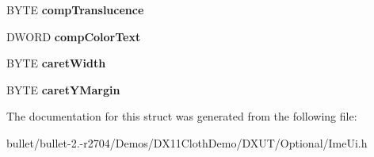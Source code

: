 \begin{DoxyCompactItemize}
\item 
\hypertarget{struct_i_m_e_u_i___a_p_p_e_a_r_a_n_c_e_a931d21cab9e666e913d1052e0c5248dd}{B\+Y\+T\+E {\bfseries comp\+Translucence}}\label{struct_i_m_e_u_i___a_p_p_e_a_r_a_n_c_e_a931d21cab9e666e913d1052e0c5248dd}

\item 
\hypertarget{struct_i_m_e_u_i___a_p_p_e_a_r_a_n_c_e_acf192d9732985e3bd61631b9bb42bfe9}{D\+W\+O\+R\+D {\bfseries comp\+Color\+Text}}\label{struct_i_m_e_u_i___a_p_p_e_a_r_a_n_c_e_acf192d9732985e3bd61631b9bb42bfe9}

\item 
\hypertarget{struct_i_m_e_u_i___a_p_p_e_a_r_a_n_c_e_a8e13b522d632c23fcfbbee69efc4acf5}{B\+Y\+T\+E {\bfseries caret\+Width}}\label{struct_i_m_e_u_i___a_p_p_e_a_r_a_n_c_e_a8e13b522d632c23fcfbbee69efc4acf5}

\item 
\hypertarget{struct_i_m_e_u_i___a_p_p_e_a_r_a_n_c_e_a27a241dece8e54e597ee1264136faa4e}{B\+Y\+T\+E {\bfseries caret\+Y\+Margin}}\label{struct_i_m_e_u_i___a_p_p_e_a_r_a_n_c_e_a27a241dece8e54e597ee1264136faa4e}

\end{DoxyCompactItemize}


The documentation for this struct was generated from the following file\+:\begin{DoxyCompactItemize}
\item 
bullet/bullet-\/2.-\/r2704/\+Demos/\+D\+X11\+Cloth\+Demo/\+D\+X\+U\+T/\+Optional/Ime\+Ui.\+h\end{DoxyCompactItemize}
